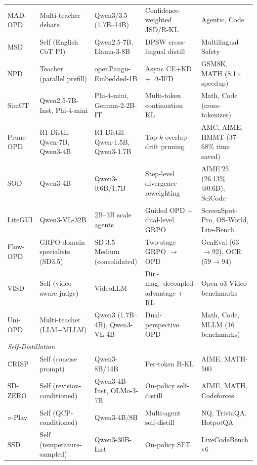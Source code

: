 \documentclass{article} %
\begin{document}
\begin{table}[t]
{\begin{tabular}{@{}lllll@{}}
        MAD-OPD \citep{wang2026madopd} & Multi-teacher debate & Qwen3/3.5 (1.7B--14B) & Confidence-weighted JSD/R-KL & Agentic, Code \\
        MSD \citep{qin2026msd} & Self (English CoT PI) & Qwen2.5-7B, Llama-3-8B & DPSW cross-lingual distill & Multilingual Safety \\
        NPD \citep{rang2026npd} & Teacher (parallel prefill) & openPangu-Embedded-1B & Async CE+KD + $\Delta$-IFD & GSM8K, MATH (8.1$\times$ speedup) \\
        SimCT \citep{sun2026simct} & Qwen2.5-7B-Inst, Phi-4-mini & Phi-4-mini, Gemma-2-2B-IT & Multi-token continuation KL & Math, Code (cross-tokenizer) \\
        Prune-OPD \citep{yang2026pruneopd} & R1-Distill-Qwen-7B, Qwen3-4B & R1-Distill-Qwen-1.5B, Qwen3-1.7B & Top-$k$ overlap drift pruning & AMC, AIME, HMMT (37--68\% time saved) \\
        SOD \citep{zhong2026sod} & Qwen3-4B & Qwen3-0.6B/1.7B & Step-level divergence reweighting & AIME'25 (26.13\% @0.6B), SciCode \\
        LiteGUI \citep{wu2026litegui} & Qwen3-VL-32B & 2B--3B scale agents & Guided OPD + dual-level GRPO & ScreenSpot-Pro, OS-World, Lite-Bench \\
        Flow-OPD \citep{fang2026flowopd} & GRPO domain specialists (SD3.5) & SD 3.5 Medium (consolidated) & Two-stage GRPO $\to$ OPD & GenEval (63$\to$92), OCR (59$\to$94) \\
        VISD \citep{lin2026visd} & Self (video-aware judge) & VideoLLM & Dir.-mag.\ decoupled advantage + RL & Open-o3-Video benchmarks \\
        Uni-OPD \citep{hou2026uniopd} & Multi-teacher (LLM+MLLM) & Qwen3 (1.7B--4B), Qwen3-VL-4B & Dual-perspective OPD & Math, Code, MLLM (16 benchmarks) \\
        \midrule
        \multicolumn{5}{l}{\textit{Self-Distillation}} \\
        \midrule
        CRISP \citep{2603.05433} & Self (concise prompt) & Qwen3-8B/14B & Per-token R-KL & AIME, MATH-500 \\
        SD-ZERO \citep{he2026selfdistillation} & Self (revision-conditioned) & Qwen3-4B-Inst, OLMo-3-7B & On-policy self-distill & AIME, MATH, Codeforces \\
        $\pi$-Play \citep{zhang2026piplay} & Self (QCP-conditioned) & Qwen3-4B/8B & Multi-agent self-distill & NQ, TriviaQA, HotpotQA \\
        SSD \citep{zhang2026embarrassingly} & Self (temperature-sampled) & Qwen3-30B-Inst & On-policy SFT & LiveCodeBench v6 \\

\end{tabular}}
\end{table}
\end{document}
